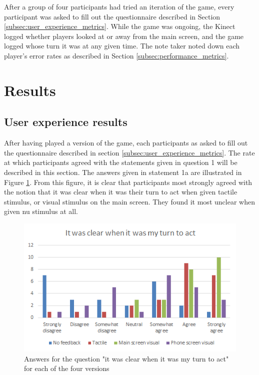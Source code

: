 After a group of four participants had tried an iteration of the game, every participant was asked to fill out the questionnaire described in Section \ref{subsec:user_experience_metrics}. While the game was ongoing, the Kinect logged whether players looked at or away from the main screen, and the game logged whose turn it was at any given time. The note taker noted down each player's error rates as described in Section \ref{subsec:performance_metrics}.

\section{Results}
\subsection{User experience results}
After having played a version of the game, each participants as asked to fill out the questionnaire described in section \ref{subsec:user_experience_metrics}. The rate at which participants agreed with the statements given in question 1 will be described in this section. The answers given in statement 1a are illustrated in Figure \ref{fig:questionnaire_a}. From this figure, it is clear that participants most strongly agreed with the notion that it was clear when it was their turn to act when given tactile stimulus, or visual stimulus on the main screen. They found it most unclear when given nu stimulus at all.

\begin{figure}[h!]
	\centering
	\includegraphics[scale=1]{figures/questionnaire_a.png}
	\caption{Answers for the question "it was clear when it was my turn to act" for each of the four versions}\label{fig:questionnaire_a}
\end{figure}

